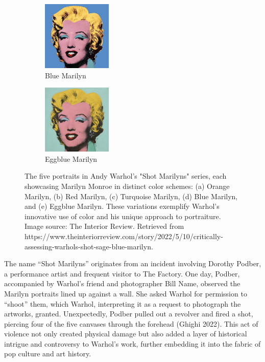 \documentclass{article}
\begin{document}
\begin{figure}[ht]
  \vspace{1em}

  \begin{minipage}{0.6\textwidth}
    \centering
    \begin{subfigure}{0.45\textwidth}
      \centering
      \includegraphics[width=125px]{main_files/figure-latex/1_4_blue_marilyn.jpg}
      \caption{Blue Marilyn}
      \label{fig:1_4_blue_marilyn}
    \end{subfigure}
    \hfill
    \begin{subfigure}{0.45\textwidth}
      \centering
      \includegraphics[width=125px]{main_files/figure-latex/1_5_eggblue_marilyn.jpg}
      \caption{Eggblue Marilyn}
      \label{fig:1_5_eggblue_marilyn}
    \end{subfigure}
  \end{minipage}

  \caption{The five portraits in Andy Warhol's "Shot Marilyns" series, each showcasing Marilyn Monroe in distinct color schemes: (a) Orange Marilyn, (b) Red Marilyn, (c) Turquoise Marilyn, (d) Blue Marilyn, and (e) Eggblue Marilyn. These variations exemplify Warhol's innovative use of color and his unique approach to portraiture. Image source: The Interior Review. Retrieved from https://www.theinteriorreview.com/story/2022/5/10/critically-assessing-warhols-shot-sage-blue-marilyn.}
  \label{fig:marilyn_variations}
\end{figure}

The name ``Shot Marilyns'' originates from an incident involving Dorothy
Podber, a performance artist and frequent visitor to The Factory. One
day, Podber, accompanied by Warhol's friend and photographer Bill Name,
observed the Marilyn portraits lined up against a wall. She asked Warhol
for permission to ``shoot'' them, which Warhol, interpreting it as a
request to photograph the artworks, granted. Unexpectedly, Podber pulled
out a revolver and fired a shot, piercing four of the five canvases
through the forehead (Ghighi 2022). This act of violence not only
created physical damage but also added a layer of historical intrigue
and controversy to Warhol's work, further embedding it into the fabric
of pop culture and art history.
\end{document}
